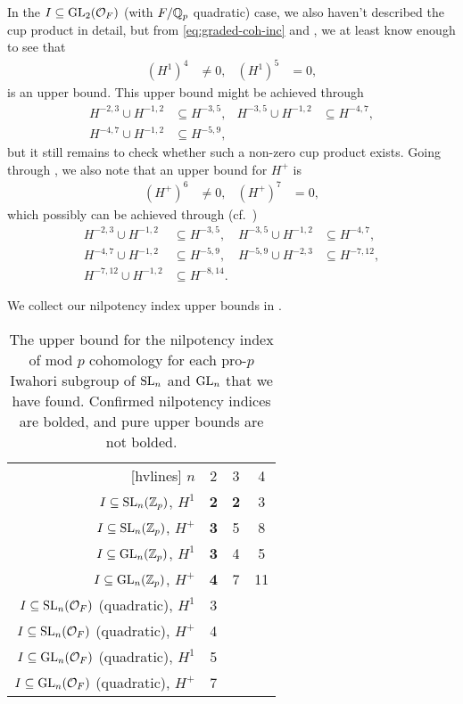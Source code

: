 In the $I \subseteq \operatorname{GL}_{2}(\mathcal{O}_{F})$ (with $F/\mathbb{Q}_{p}$ quadratic) case, we also haven't described the cup product in detail, but from \eqref{eq:graded-coh-inc} and , we at least know enough to see that
\begin{align*}
  (H^{1})^{4} &\neq 0, & (H^{1})^{5} &= 0,
\end{align*}
is an upper bound. This upper bound might be achieved through
\begin{align*}
  H^{-2,3} \cup H^{-1,2} &\subseteq H^{-3,5}, & H^{-3,5} \cup H^{-1,2} &\subseteq H^{-4,7}, \\
  H^{-4,7} \cup H^{-1,2} &\subseteq H^{-5,9},
\end{align*}
but it still remains to check whether such a non-zero cup product exists. Going through , we also note that an upper bound for $H^{+}$ is
\begin{align*}
  (H^{+})^{6} &\neq 0, & (H^{+})^{7} &= 0,
\end{align*}
which possibly can be achieved through (cf.\ \cite{code})
\begin{align*}
  H^{-2,3} \cup H^{-1,2} &\subseteq H^{-3,5}, & H^{-3,5} \cup H^{-1,2} &\subseteq H^{-4,7}, \\
  H^{-4,7} \cup H^{-1,2} &\subseteq H^{-5,9}, & H^{-5,9} \cup H^{-2,3} &\subseteq H^{-7,12}, \\
  H^{-7,12} \cup H^{-1,2} &\subseteq H^{-8,14}.
\end{align*}

We collect our nilpotency index upper bounds in .

\begin{table}[ht]
  \centering
  \caption[Nilpotency index upper bounds for mod $p$ cohomology of pro-$p$ Iwahori subgroups]{The upper bound for the nilpotency index of mod $p$ cohomology for each pro-$p$ Iwahori subgroup of $\operatorname{SL}_{n}$ and $\operatorname{GL}_{n}$ that we have found. Confirmed nilpotency indices are bolded, and pure upper bounds are not bolded.}
  \label{tab:nilp-ind}
  \begin{NiceTabular}{rccc}[hvlines]
    $n$ & 2 & 3 & 4 \\
    $I \subseteq \operatorname{SL}_{n}(\mathbb{Z}_{p})$, $H^{1}$ & \textbf{2} & \textbf{2} & 3 \\
    $I \subseteq \operatorname{SL}_{n}(\mathbb{Z}_{p})$, $H^{+}$ & \textbf{3} & 5 & 8  \\
    $I \subseteq \operatorname{GL}_{n}(\mathbb{Z}_{p})$, $H^{1}$ & \textbf{3} & 4 & 5 \\
    $I \subseteq \operatorname{GL}_{n}(\mathbb{Z}_{p})$, $H^{+}$ & \textbf{4} & 7 & 11 \\
    $I \subseteq \operatorname{SL}_{n}(\mathcal{O}_{F})$ (quadratic), $H^{1}$ & 3 \\
    $I \subseteq \operatorname{SL}_{n}(\mathcal{O}_{F})$ (quadratic), $H^{+}$ & 4 \\
    $I \subseteq \operatorname{GL}_{n}(\mathcal{O}_{F})$ (quadratic), $H^{1}$ & 5 \\
    $I \subseteq \operatorname{GL}_{n}(\mathcal{O}_{F})$ (quadratic), $H^{+}$ & 7
  \end{NiceTabular}
\end{table}

